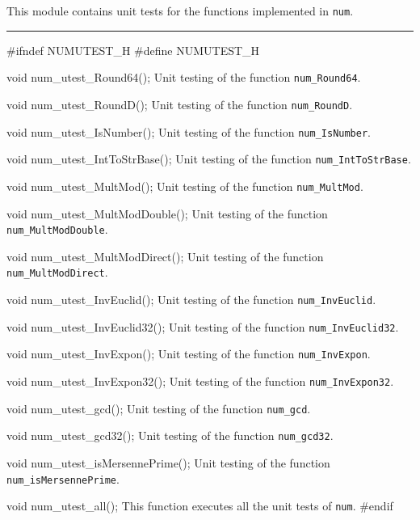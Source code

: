 
This module contains unit tests for the functions implemented in {\tt num}. 

\bigskip
\hrule
\code
\hide
#ifndef NUMUTEST_H
#define NUMUTEST_H
\endhide
\endcode

\code
void num_utest_Round64();
\endcode
 \tab  Unit testing of the function {\tt num\_Round64}.
 \endtab
\code

void num_utest_RoundD();
\endcode
 \tab  Unit testing of the function {\tt num\_RoundD}.
 \endtab
\code

void num_utest_IsNumber();
\endcode
 \tab  Unit testing of the function {\tt num\_IsNumber}.
 \endtab
\code

void num_utest_IntToStrBase();
\endcode
 \tab  Unit testing of the function {\tt num\_IntToStrBase}.
 \endtab
\code

void num_utest_MultMod();
\endcode
 \tab  Unit testing of the function {\tt num\_MultMod}.
 \endtab
\code

void num_utest_MultModDouble();
\endcode
 \tab  Unit testing of the function {\tt num\_MultModDouble}.
 \endtab
\code

void num_utest_MultModDirect();
\endcode
 \tab  Unit testing of the function {\tt num\_MultModDirect}.
 \endtab
\code

void num_utest_InvEuclid();
\endcode
 \tab  Unit testing of the function {\tt num\_InvEuclid}.
 \endtab
\code

void num_utest_InvEuclid32();
\endcode
 \tab  Unit testing of the function {\tt num\_InvEuclid32}.
 \endtab
\code

void num_utest_InvExpon();
\endcode
 \tab  Unit testing of the function {\tt num\_InvExpon}.
 \endtab
\code

void num_utest_InvExpon32();
\endcode
 \tab  Unit testing of the function {\tt num\_InvExpon32}.
 \endtab
\code

void num_utest_gcd();
\endcode
 \tab  Unit testing of the function {\tt num\_gcd}.
 \endtab
\code

void num_utest_gcd32();
\endcode
 \tab  Unit testing of the function {\tt num\_gcd32}.
 \endtab
\code

void num_utest_isMersennePrime();
\endcode
 \tab  Unit testing of the function {\tt num\_isMersennePrime}.
 \endtab
\code

void num_utest_all();
\endcode
 \tab  This function executes all the unit tests of {\tt num}.
 \endtab
\code
\hide
#endif
\endhide
\endcode

